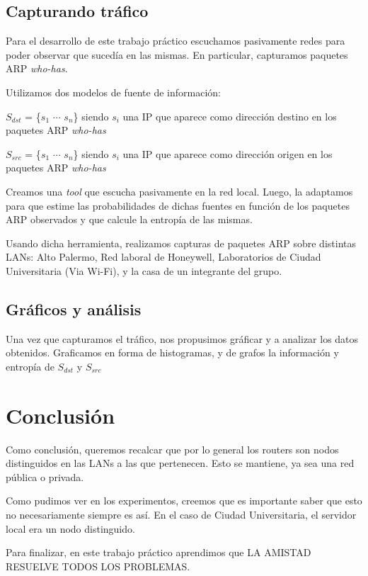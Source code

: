 \documentclass[10pt, a4paper]{article}
\begin{document}
\subsection{Capturando tráfico}
Para el desarrollo de este trabajo práctico escuchamos pasivamente redes para poder observar que sucedía en las mismas. En particular, capturamos paquetes ARP \emph{who-has}.

Utilizamos dos modelos de fuente de información:

$S_{dst}$ = \{$s_1$ $\cdots$ $s_n$\} siendo $s_i$ una IP que aparece como dirección destino en los paquetes ARP \emph{who-has}

$S_{src}$ = \{$s_1$ $\cdots$ $s_n$\} siendo $s_i$ una IP que aparece como dirección origen en los paquetes ARP \emph{who-has}

Creamos una \emph{tool} que escucha pasivamente en la red local. Luego, la adaptamos para que estime las probabilidades de dichas fuentes en función de los paquetes ARP observados y que calcule la entropía de las mismas.

Usando dicha herramienta, realizamos capturas de paquetes ARP sobre distintas LANs: Alto Palermo, Red laboral de Honeywell, Laboratorios de Ciudad Universitaria (Via Wi-Fi), y la casa de un integrante del grupo.

\subsection{Gráficos y análisis}
Una vez que capturamos el tráfico, nos propusimos gráficar y a analizar los datos obtenidos. Graficamos en forma de histogramas, y de grafos la información y entropía de $S_{dst}$ y $S_{src}$
% 
% 
% 
% 


\section{Conclusión}
Como conclusión, queremos recalcar que por lo general los routers son nodos distinguidos en las LANs a las que pertenecen. Esto se mantiene, ya sea una red pública o privada.

Como pudimos ver en los experimentos, creemos que es importante saber que esto no necesariamente siempre es así. En el caso de Ciudad Universitaria, el servidor local era un nodo distinguido.

Para finalizar, en este trabajo práctico aprendimos que LA AMISTAD RESUELVE TODOS LOS PROBLEMAS.
\end{document}
